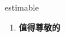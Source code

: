 
\begin{frame}
{\huge estimable}
\begin{center}
\begin{enumerate}\Large
  \item \textbf{值得尊敬的}
\end{enumerate}
\end{center}
\end{frame}
